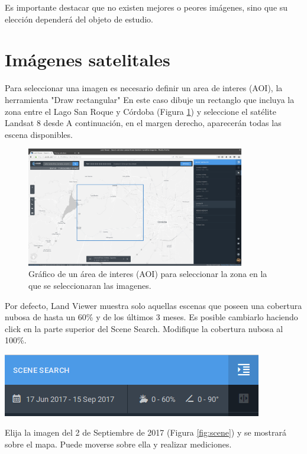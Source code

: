\documentclass[a4paper,12pt]{book}
\begin{document}
Es importante destacar que no existen mejores o peores imágenes, sino que su elección dependerá del objeto de estudio.

\section{Imágenes satelitales}
Para seleccionar una imagen es necesario definir un area de interes (AOI), la herramienta "Draw rectangular"   %
En este caso dibuje un rectanglo que incluya la zona entre el Lago San Roque y Córdoba (Figura \ref{fig:aoi}) y seleccione el satélite Landsat 8 desde %
A continuación, en el margen derecho, aparecerán todas las escena disponibles.

\begin{figure}[h!]
    \centering
    \includegraphics[width=0.85\textwidth]{fig:aoi.png}
    \caption{Gráfico de un área de interes (AOI) para seleccionar la zona en la que se seleccionaran las imagenes.}
    \label{fig:aoi}
\end{figure}

 Por defecto, Land Viewer muestra solo aquellas escenas que poseen una cobertura nubosa de hasta un 60\% y de los últimos 3 meses. Es posible cambiarlo haciendo click en la parte superior del Scene Search.  Modifique la cobertura nubosa al 100\%.
\begin{center}\includegraphics[scale=0.4]{in:nubes.png}\end{center}

Elija la imagen del 2 de Septiembre de 2017 (Figura \ref{fig:scene}) y se mostrará sobre el mapa. Puede moverse sobre ella y realizar mediciones.
\end{document}
